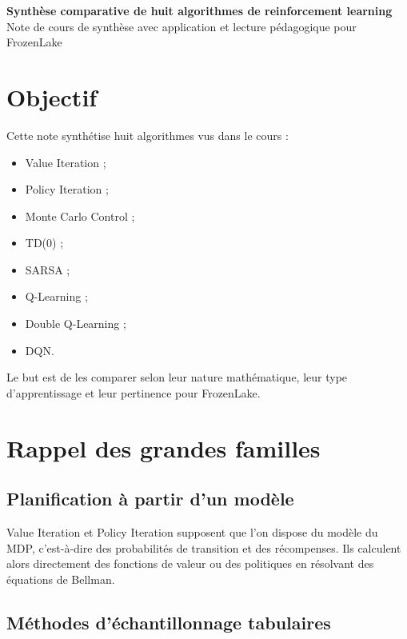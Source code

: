 \documentclass[11pt,a4paper]{article}
\begin{document}
\begin{center}
    {\LARGE\bfseries Synthèse comparative de huit algorithmes de reinforcement learning}\\[0.4em]
    {\large Note de cours de synthèse avec application et lecture pédagogique pour FrozenLake}
\end{center}

\vspace{0.6em}

\section{Objectif}

Cette note synthétise huit algorithmes vus dans le cours :
\begin{itemize}[leftmargin=1.6em]
    \item Value Iteration ;
    \item Policy Iteration ;
    \item Monte Carlo Control ;
    \item TD(0) ;
    \item SARSA ;
    \item Q-Learning ;
    \item Double Q-Learning ;
    \item DQN.
\end{itemize}

Le but est de les comparer selon leur nature mathématique, leur type d'apprentissage et leur pertinence pour FrozenLake.

\section{Rappel des grandes familles}

\subsection{Planification à partir d'un modèle}

Value Iteration et Policy Iteration supposent que l'on dispose du modèle du MDP, c'est-à-dire des probabilités de transition et des récompenses. Ils calculent alors directement des fonctions de valeur ou des politiques en résolvant des équations de Bellman.

\subsection{Méthodes d'échantillonnage tabulaires}
\end{document}

